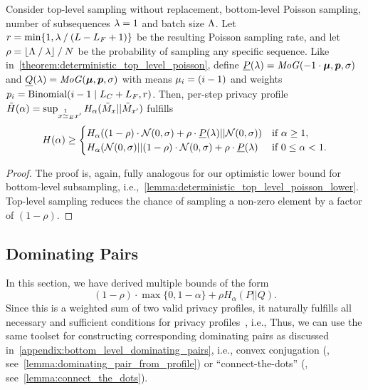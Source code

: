 \begin{theorem}
    Consider
    top-level sampling without replacement, 
    bottom-level Poisson sampling, 
    number of subsequences $\lambda = 1$ and 
    batch size $\Lambda$.
    Let $r = \min\{1, \lambda \mathbin{/} (L - L_F + 1)\}$
    be the resulting Poisson sampling rate, 
    and let 
    $\rho = \lfloor \Lambda \mathbin{/} \lambda \rfloor \mathbin{/} N$ be the probability of sampling any specific sequence. 
    Like in~\cref{theorem:deterministic_top_level_poisson}, define
    $\underline{P}(\lambda) = \mathit{MoG}(-1 \cdot {\bm{\mu}}, {\bm{p}}, \sigma)$ and 
    $\underline{Q}(\lambda) = \mathit{MoG}({\bm{\mu}}, {\bm{p}}, \sigma)$ with
    means ${\mu}_i = (i - 1)$ and 
    weights ${p}_i = \mathrm{Binomial}(i - 1 \mid L_C + L_F, r)$.
    Then, per-step privacy profile $\tilde{H}(\alpha) = \sup_{x \overset{1}{\simeq}_{E} x'} H_\alpha(\tilde{M}_x || \tilde{M}_{x'})$ fulfills 
    \begin{equation*}
        H(\alpha) \geq 
        \begin{cases}
            H_\alpha((1 - \rho) \cdot \mathcal{N}(0,\sigma)  + \rho \cdot \underline{P}(\lambda) || \mathcal{N}(0,\sigma)) & \text{if } \alpha \geq 1,\\
            H_\alpha(\mathcal{N}(0,\sigma) || (1 - \rho) \cdot \mathcal{N}(0,\sigma)  + \rho \cdot \underline{P}(\lambda)  & \text{if } 0 \leq \alpha < 1.
        \end{cases}
    \end{equation*}
\end{theorem}
\begin{proof}
    The proof is, again, fully analogous for our optimistic lower bound for bottom-level subsampling, i.e.,~\cref{lemma:deterministic_top_level_poisson_lower}.
    Top-level sampling reduces the chance of sampling a non-zero element by a factor of $(1-\rho)$.
\end{proof}

\subsection{Dominating Pairs}
In this section, we have derived multiple bounds of the form
\begin{equation*}
    (1 - \rho) \cdot \max \{ 0, 1 - \alpha \} + \rho H_\alpha(P || Q).
\end{equation*}
Since this is a weighted sum of two valid privacy profiles, it naturally fulfills all necessary and sufficient conditions for privacy profiles~\cite{zhu2022optimal}, i.e.,
\privacyprofilerequirements*
Thus, we can use the same toolset for constructing corresponding dominating pairs as discussed in~\cref{appendix:bottom_level_dominating_pairs}, i.e., convex conjugation (\cite{zhu2022optimal}, see~\cref{lemma:dominating_pair_from_profile}) or ``connect-the-dots'' (\cite{doroshenko2022connect}, see~\cref{lemma:connect_the_dots}).